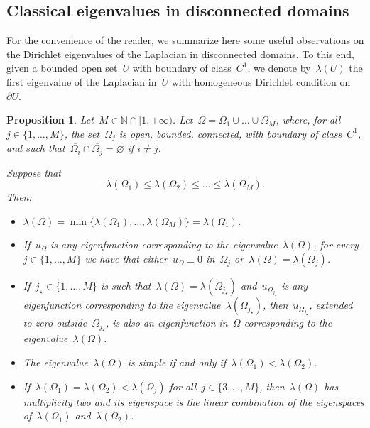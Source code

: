 \documentclass[12pt,a4paper,intlimits,sumlimits]{amsart}
\def \N {\mathbb{N}}
\theoremstyle{definition}
\theoremstyle{plain}
\newtheorem{proposition}[definition]{Proposition}
\renewcommand{\emptyset}{\varnothing}
\numberwithin{equation}{section}
\renewcommand{\le}{\leqslant}
\begin{document}
\begin{appendix}
\section{Classical eigenvalues in disconnected domains}

For the convenience of the reader, we summarize here some useful observations on the Dirichlet eigenvalues
of the Laplacian in disconnected domains. To this end, given a bounded open set~$U$ with boundary of class~$C^1$,
we denote by~$\lambda(U)$ the first eigenvalue of the Laplacian in~$U$ with homogeneous Dirichlet condition
on~$\partial U$.

\begin{proposition}\label{PROPD1}
Let~$M\in\N\cap[1,+\infty)$.
Let~$\Omega=\Omega_1\cup\dots\cup\Omega_M$, where, for all~$j\in\{1,\dots,M\}$, the set~$\Omega_j$ is open, bounded, connected,
with boundary of class~$C^1$,
and such that~$\overline{\Omega_i}\cap\overline{ \Omega_j}=\emptyset$ if $i\neq j$. 

Suppose that
\begin{equation}\label{lammegmbmejp}
\lambda(\Omega_1)\le\lambda(\Omega_2)\le\dots\le\lambda(\Omega_M).\end{equation}
Then:
\begin{itemize}
\item[(i).] $\lambda(\Omega)=\min\{\lambda(\Omega_1),\dots,\lambda(\Omega_M)\}=\lambda(\Omega_1)$.
\item[(ii).] If~$u_\Omega$ is any eigenfunction corresponding to the eigenvalue~$\lambda(\Omega)$,
for every~$j\in\{1,\dots,M\}$ we have that either~$u_\Omega\equiv0$ in~$\Omega_j$
or~$\lambda(\Omega)=\lambda(\Omega_j)$.
\item[(iii).] If~$j_\star\in\{1,\dots,M\}$ is such that~$\lambda(\Omega)=\lambda(\Omega_{j_\star})$
and~$u_{\Omega_{j_\star}}$ is any eigenfunction corresponding to the eigenvalue~$\lambda(\Omega_{j_\star})$,
then~$u_{\Omega_{j_\star}}$, extended to zero outside~${\Omega_{j_\star}}$,
is also an eigenfunction in~$\Omega$ corresponding to the eigenvalue~$\lambda(\Omega)$.
\item[(iv).] The eigenvalue~$\lambda(\Omega)$ is simple if and only if~$\lambda(\Omega_1)<\lambda(\Omega_2)$.
\item[(v).] If~$\lambda(\Omega_1)=\lambda(\Omega_2)<\lambda(\Omega_j)$
for all~$j\in\{3,\dots,M\}$, then~$\lambda(\Omega)$ has multiplicity two and its eigenspace is the linear combination of the eigenspaces of~$\lambda(\Omega_1)$ and~$\lambda(\Omega_2)$.
\end{itemize}
\end{proposition}


\end{appendix}
\end{document}
